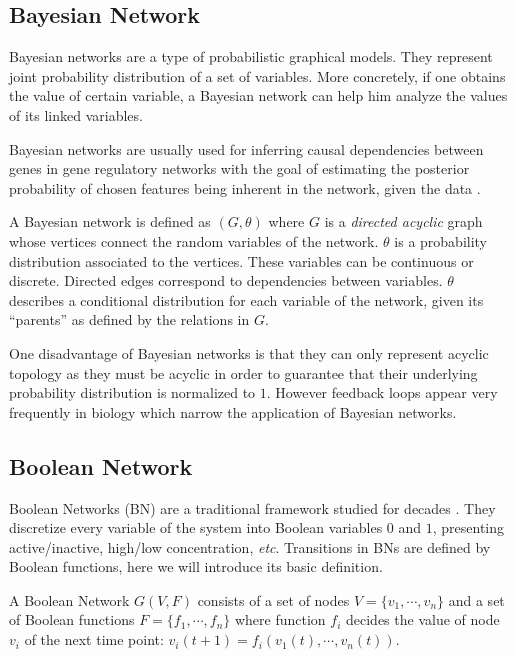 \subsection{Bayesian Network}
Bayesian networks are a type of probabilistic graphical models. 
They represent joint probability distribution of a set of variables.
More concretely, if one obtains the value of certain variable, a Bayesian network can help him analyze the values of its linked variables.

Bayesian networks are usually used for inferring causal dependencies between genes in gene regulatory networks with the goal of estimating the posterior probability of chosen features being inherent in the network, given the data \cite{friedman2000using}.

A Bayesian network is defined as $(G, \theta)$ where $G$ is a \textit{directed acyclic} graph whose vertices connect the random variables of the network.
$\theta$ is a probability distribution associated to the vertices. 
These variables can be continuous or discrete. 
Directed edges correspond to dependencies between variables. 
$\theta$ describes a conditional distribution for each variable of the network, given its ``parents'' as defined by the relations in $G$.

One disadvantage of Bayesian networks is that they can only represent acyclic topology as they must be acyclic in order to guarantee that their underlying probability distribution is normalized to $1$.
However feedback loops appear very frequently in biology which narrow the application of Bayesian networks.

\subsection{Boolean Network}
Boolean Networks (BN) are a traditional framework studied for decades \cite{kauffman1969}.
They discretize every variable of the system into Boolean variables $0$ and $1$, presenting active/inactive, high/low concentration, \textit{etc}. 
Transitions in BNs are defined by Boolean functions, here we will introduce its basic definition.

\begin{definition}
A Boolean Network $G(V,F)$ consists of a set of nodes $V=\{v_1,\cdots,v_n\}$ and a set of Boolean functions $F=\{f_1,\cdots,f_n\}$ where function $f_i$ decides the value of node $v_i$ of the next time point: $v_i(t+1)=f_i(v_1(t),\cdots,v_n(t))$.
\end{definition}




